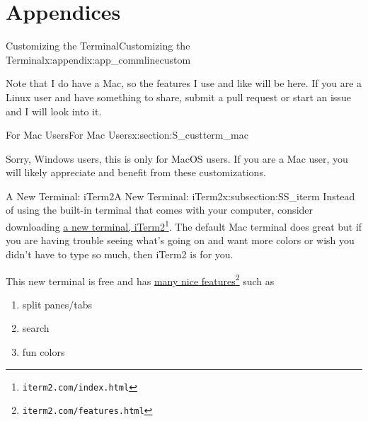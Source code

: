 \documentclass[oneside,10pt,]{book}
\begin{document}
\part*{Appendices}%
%
%
\typeout{************************************************}
\typeout{************************************************}
%
\begin{appendixptx}{Customizing the Terminal}{}{Customizing the Terminal}{}{}{x:appendix:app_commlinecustom}
%
\begin{introduction}{}%
Note that I do have a Mac, so the features I use and like will be here. If you are a Linux user and have something to share, submit a pull request or start an issue and I will look into it.%
\end{introduction}%
%
%
\typeout{************************************************}
\typeout{************************************************}
%
\begin{sectionptx}{For Mac Users}{}{For Mac Users}{}{}{x:section:S_custterm_mac}
%
\begin{introduction}{}%
Sorry, Windows users, this is only for MacOS users. If you are a Mac user, you will likely appreciate and benefit from these customizations.%
\end{introduction}%
%
%
\typeout{************************************************}
\typeout{************************************************}
%
\begin{subsectionptx}{A New Terminal: iTerm2}{}{A New Terminal: iTerm2}{}{}{x:subsection:SS_iterm}
%
Instead of using the built-in terminal that comes with your computer, consider downloading \href{https://iterm2.com/index.html}{a new terminal, iTerm2}\footnote{\nolinkurl{iterm2.com/index.html}\label{g:fn:idm479241960}}. The default Mac terminal does great but if you are having trouble seeing what's going on and want more colors or wish you didn't have to type so much, then iTerm2 is for you.%
\par
This new terminal is free and has \href{https://iterm2.com/features.html}{many nice features}\footnote{\nolinkurl{iterm2.com/features.html}\label{g:fn:idm479239400}} such as%
\begin{enumerate}
\item{}split panes\slash{}tabs%
\item{}search%
\item{}fun colors%

\end{enumerate}
\end{subsectionptx}
\end{sectionptx}
\end{appendixptx}
\end{document}
